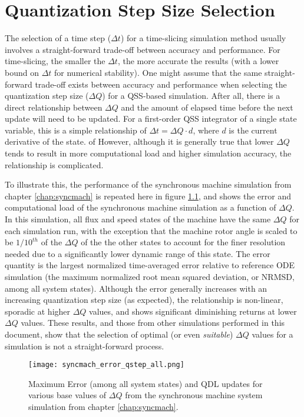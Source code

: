 
\chapter{Quantization Step Size Selection}\label{chap:deltaq}

The selection of a time step ($\Delta t$) for a time-slicing simulation method usually involves a straight-forward trade-off between accuracy and performance. For time-slicing, the smaller the $\Delta t$, the more accurate the results (with a lower bound on $\Delta t$ for numerical stability). One might assume that the same straight-forward trade-off exists between accuracy and performance when selecting the quantization step size ($\Delta Q$) for a QSS-based simulation. After all, there is a direct relationship between $\Delta Q$ and the amount of elapsed time before the next update will need to be updated. For a first-order QSS integrator of a single state variable, this is a simple relationship of $\Delta t = \Delta Q \cdot d$, where $d$ is the current derivative of the state. of  However, although it is generally true that lower $\Delta Q$ tends to result in more computational load and higher simulation accuracy, the relationship is complicated. 

To illustrate this, the performance of the synchronous machine simulation from chapter \ref{chap:syncmach} is repeated here in figure \ref{fig:syncmach_error_qstep_all_2}, and shows the error and computational load of the synchronous machine simulation as a function of $\Delta Q$. In this simulation, all flux and speed states of the machine have the same $\Delta Q$ for each simulation run, with the exception that the machine rotor angle is scaled to be $1/10^{th}$ of the $\Delta Q$ of the the other states to account for the finer resolution needed due to a significantly lower dynamic range of this state. The error quantity is the largest normalized time-averaged error relative to reference ODE simulation (the maximum normalized root mean squared deviation, or NRMSD, among all system states). Although the error generally increases with an increasing quantization step size (as expected), the relationship is non-linear, sporadic at higher $\Delta Q$ values, and shows significant diminishing returns at lower $\Delta Q$ values. These results, and those from other simulations performed in this document, show that the selection of optimal (or even \emph{suitable}) $\Delta Q$ values for a simulation is not a straight-forward process.

\begin{figure}[h]
    \centering
    \texttt{[image: syncmach\_error\_qstep\_all.png]}
    \caption{Maximum Error (among all system states) and QDL updates for various base values of $\Delta Q$ from the synchronous machine system simulation from chapter \ref{chap:syncmach}.}
    \label{fig:syncmach_error_qstep_all_2}
\end{figure} 


